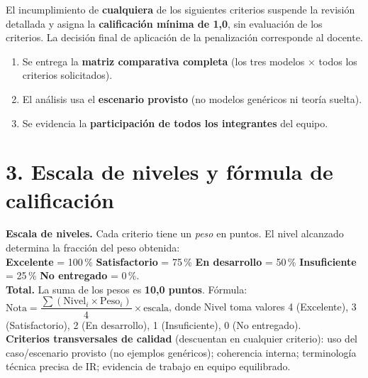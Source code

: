 \documentclass[11pt]{article}
\begin{document}
\vspace{8pt}
\begin{tcolorbox}[colback=lightred,colframe=red!60!black,
  title=\textbf{2. Requisitos previos de admisión (gatekeepers) --- verificación previa a la revisión},
  fonttitle=\bfseries,boxrule=0.8pt,arc=2mm]
El incumplimiento de \textbf{cualquiera} de los siguientes criterios suspende la revisión detallada y asigna la \textbf{calificación mínima de 1,0}, sin evaluación de los criterios. La decisión final de aplicación de la penalización corresponde al docente.
\begin{enumerate}[leftmargin=18pt,itemsep=2pt]
  \item Se entrega la \textbf{matriz comparativa completa} (los tres modelos $\times$ todos los criterios solicitados).
  \item El análisis usa el \textbf{escenario provisto} (no modelos genéricos ni teoría suelta).
  \item Se evidencia la \textbf{participación de todos los integrantes} del equipo.
\end{enumerate}
\end{tcolorbox}

\section*{\textcolor{utegreendk}{3. Escala de niveles y fórmula de calificación}}

\noindent\colorbox{boxgray}{\parbox{\dimexpr\linewidth-2\fboxsep}{\small
\textbf{Escala de niveles.} Cada criterio tiene un \emph{peso} en puntos. El nivel alcanzado determina la fracción del peso obtenida:\\[2pt]
\colorbox{lvlexc}{\textbf{Excelente} = 100\,\%}\quad
\colorbox{lvlsat}{\textbf{Satisfactorio} = 75\,\%}\quad
\colorbox{lvldev}{\textbf{En desarrollo} = 50\,\%}\quad
\colorbox{lvlins}{\textbf{Insuficiente} = 25\,\%}\quad
\textbf{No entregado} = 0\,\%.\\[4pt]
\textbf{Total.} La suma de los pesos es \textbf{10,0 puntos}. Fórmula: $\text{Nota} = \dfrac{\sum (\text{Nivel}_i \times \text{Peso}_i)}{4} \times \text{escala}$, donde Nivel toma valores 4 (Excelente), 3 (Satisfactorio), 2 (En desarrollo), 1 (Insuficiente), 0 (No entregado).\\[4pt]
\textbf{Criterios transversales de calidad} (descuentan en cualquier criterio): uso del caso/escenario provisto (no ejemplos genéricos); coherencia interna; terminología técnica precisa de IR; evidencia de trabajo en equipo equilibrado.
}}
\end{document}

